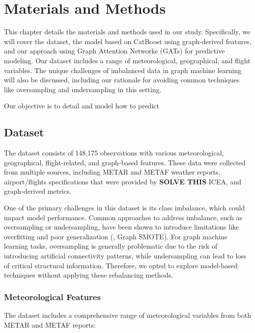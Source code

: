 \chapter[Materials and Methods]{Materials and Methods}
\label{Materials}

This chapter details the materials and methods used in our study. Specifically, we will cover the dataset, the model based on CatBoost using graph-derived features, and our approach using Graph Attention Networks (GATs) for predictive modeling. Our dataset includes a range of meteorological, geographical, and flight variables. The unique challenges of imbalanced data in graph machine learning will also be discussed, including our rationale for avoiding common techniques like oversampling and undersampling in this setting.

Our objective is to detail and model how to predict 

\section{Dataset}
\label{Dataset}

The dataset consists of 148,175 observations with various meteorological, geographical, flight-related, and graph-based features. These data were collected from multiple sources, including METAR and METAF weather reports, airport/flights specifications that were provided by \textbf{SOLVE THIS} ICEA, and graph-derived metrics.

One of the primary challenges in this dataset is its class imbalance, which could impact model performance. Common approaches to address imbalance, such as oversampling or undersampling, have been shown to introduce limitations like overfitting and poor generalization (\cite{zhao2021graphsmote}, Graph SMOTE). For graph machine learning tasks, oversampling is generally problematic due to the risk of introducing artificial connectivity patterns, while undersampling can lead to loss of critical structural information. Therefore, we opted to explore model-based techniques without applying these rebalancing methods.

\subsection{Meteorological Features}
The dataset includes a comprehensive range of meteorological variables from both METAR and METAF reports:

